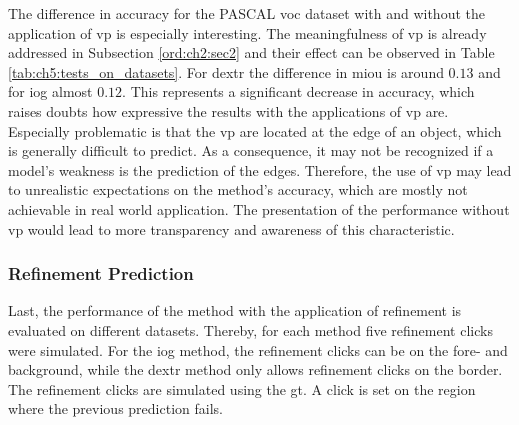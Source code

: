 The difference in accuracy for the PASCAL \gls{voc} dataset \cite{Eve20-PascalVOC} with and without the application of \gls{vp} is especially interesting.
The meaningfulness of \gls{vp} is already addressed in Subsection \ref{ord:ch2:sec2} and their effect can be observed in Table \ref{tab:ch5:tests_on_datasets}.
For \gls{dextr} the difference in \gls{miou} is around $ 0.13 $ and for \gls{iog} almost $ 0.12 $.
This represents a significant decrease in accuracy, which raises doubts how expressive the results with the applications of \gls{vp} are.
Especially problematic is that the \gls{vp} are located at the edge of an object, which is generally difficult to predict.
As a consequence, it may not be recognized if a model's weakness is the prediction of the edges.
Therefore, the use of \gls{vp} may lead to unrealistic expectations on the method's accuracy, which are mostly not achievable in real world application.
The presentation of the performance without \gls{vp} would lead to more transparency and awareness of this characteristic.

\subsubsection{Refinement Prediction}

Last, the performance of the method with the application of refinement is evaluated on different datasets.
Thereby, for each method five refinement clicks were simulated.
For the \gls{iog} method, the refinement clicks can be on the fore- and background, while the \gls{dextr} method only allows refinement clicks on the border.
The refinement clicks are simulated using the \gls{gt}.
A click is set on the region where the previous prediction fails.

